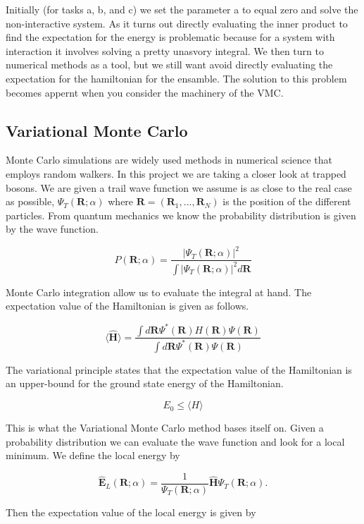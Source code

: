 \noindent Initially (for tasks a, b, and c) we set the parameter a to equal zero and solve the non-interactive system. As it turns out directly evaluating the inner product to find the expectation for the energy is problematic because for a system with interaction it involves solving a pretty unasvory integral. We then turn to numerical methods as a tool, but we still want avoid directly evaluating the expectation for the hamiltonian for the ensamble. The solution to this problem becomes appernt when you consider the machinery of the VMC.

\subsection{Variational Monte Carlo}

Monte Carlo simulations are widely used methods in numerical science that employs random walkers. 
In this project we are taking a closer look at trapped bosons. We are given a trail wave function we assume is as close to the real case as possible, $\Psi_T(\mathbf{R};\alpha)$ where $\mathbf{R} = (\mathbf{R}_1, ... , \mathbf{R}_N)$ is the position of the different particles. 
From quantum mechanics we know the probability distribution is given by the wave function. 

$$P(\mathbf{R}; \alpha) = \frac{|\Psi_T(\mathbf{R};\alpha)|^2}{\int |\Psi_T(\mathbf{R};\alpha)|^2 d\mathbf{R}}$$

Monte Carlo integration allow us to evaluate the integral at hand. The expectation value of the Hamiltonian is given as follows. 

$$\langle \widehat{\mathbf{H}}\rangle = \frac{\int d \mathbf{R} \Psi^{\ast} (\mathbf{R})H(\mathbf{R}) \Psi(\mathbf{R})}{\int d \mathbf{R} \Psi^{\ast} (\mathbf{R}) \Psi(\mathbf{R})}$$

The variational principle states that the expectation value of the Hamiltonian is an upper-bound for the ground state energy of the Hamiltonian.

$$E_0 \leq \langle H \rangle$$

This is what the Variational Monte Carlo method bases itself on. Given a probability distribution we can evaluate the wave function and look for a local minimum. We define the local energy by

$$\widehat{\mathbf{E}}_L(\mathbf{R};\alpha) = \frac{1}{\Psi_T(\mathbf{R};\alpha)}\widehat{\mathbf{H}}\Psi_T(\mathbf{R};\alpha).$$

Then the expectation value of the local energy is given by


